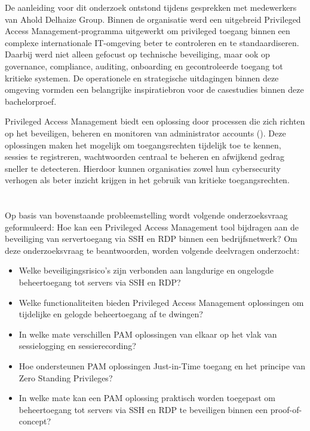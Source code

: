 De aanleiding voor dit onderzoek ontstond tijdens gesprekken met medewerkers van Ahold Delhaize Group. Binnen de organisatie werd een uitgebreid Privileged Access Management-programma uitgewerkt om privileged toegang binnen een complexe internationale IT-omgeving beter te controleren en te standaardiseren. Daarbij werd niet alleen gefocust op technische beveiliging, maar ook op governance, compliance, auditing, onboarding en gecontroleerde toegang tot kritieke systemen. De operationele en strategische uitdagingen binnen deze omgeving vormden een belangrijke inspiratiebron voor de casestudies binnen deze bachelorproef. 

Privileged Access Management biedt een oplossing door processen die zich richten op het beveiligen, beheren en monitoren van administrator accounts (\cite{garbis2021zero}). Deze oplossingen maken het mogelijk om toegangsrechten tijdelijk toe te kennen, sessies te registreren, wachtwoorden centraal te beheren en afwijkend gedrag sneller te detecteren. Hierdoor kunnen organisaties zowel hun cybersecurity verhogen als beter inzicht krijgen in het gebruik van kritieke toegangsrechten.


\section{}%
\label{sec:onderzoeksvraag}

Op basis van bovenstaande probleemstelling wordt volgende onderzoeksvraag geformuleerd:
Hoe kan een Privileged Access Management tool bijdragen aan de beveiliging van servertoegang via SSH en RDP binnen een bedrijfsnetwerk?
Om deze onderzoeksvraag te beantwoorden, worden volgende deelvragen onderzocht:

\begin{itemize}
	\item Welke beveiligingsrisico’s zijn verbonden aan langdurige en ongelogde beheertoegang tot servers via SSH en RDP?
	\item Welke functionaliteiten bieden Privileged Access Management oplossingen om tijdelijke en gelogde beheertoegang af te dwingen?
	\item In welke mate verschillen PAM oplossingen van elkaar op het vlak van sessielogging en sessierecording?
	\item Hoe ondersteunen PAM oplossingen Just-in-Time toegang en het principe van Zero Standing Privileges?
	\item In welke mate kan een PAM oplossing praktisch worden toegepast om beheertoegang tot servers via SSH en RDP te beveiligen binnen een proof-of-concept?
\end{itemize}

